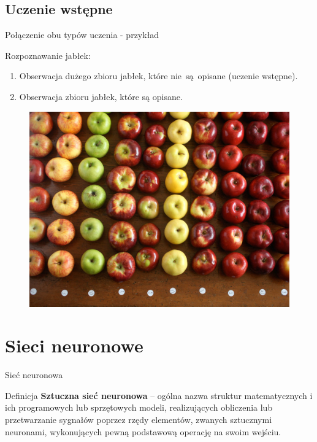 \documentclass[xcolor=dvipsnames]{beamer}
\begin{document}
\subsection{Uczenie wstępne}
\begin{frame}{Połączenie obu typów uczenia - przykład}
	\begin{minipage}[t]{0.45\linewidth}
		Rozpoznawanie jabłek:
		\begin{enumerate}
			\item Obserwacja dużego zbioru jabłek, które nie~są~opisane (uczenie wstępne).
			\item Obserwacja zbioru jabłek, które są opisane.
		\end{enumerate}
		\vspace{5mm}	
	\end{minipage}%
	\hfill
	\begin{minipage}[t]{0.45\linewidth}
		\vfill
		\begin{figure}
			\includegraphics[width=\textwidth]{img/apples.jpg} 
		\end{figure}
	\end{minipage}
\end{frame}
\section{Sieci neuronowe}
\begin{frame}{Sieć neuronowa}
	\begin{block}{Definicja}
		\textbf{Sztuczna sieć neuronowa} --  ogólna nazwa struktur matematycznych i ich programowych lub sprzętowych modeli, realizujących obliczenia lub przetwarzanie sygnałów poprzez rzędy elementów, zwanych sztucznymi neuronami, wykonujących pewną podstawową operację na swoim wejściu.\\
		\vspace{5mm}
		\hspace*{}
	\end{block}	
\end{frame}
\end{document}
